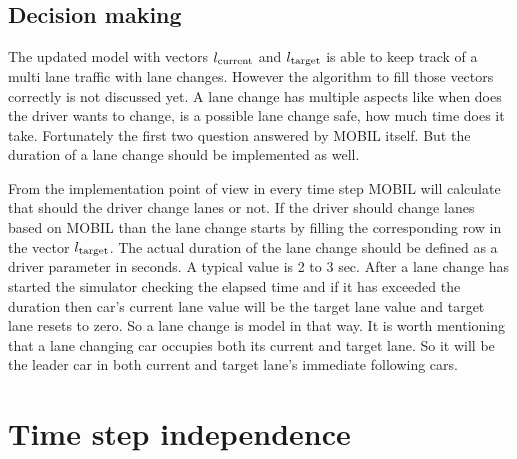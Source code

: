 		\subsection*{Decision making}
		The updated model with vectors $l_{\rm current}$ and $l_{\rm target}$ is able to keep track of a multi lane traffic with lane changes. However the algorithm to fill those vectors correctly is not discussed yet. A lane change has multiple aspects like when does the driver wants to change, is a possible lane change safe, how much time does it take. Fortunately the first two question answered by MOBIL itself. But the duration of a lane change should be implemented as well.

		From the implementation point of view in every time step MOBIL will calculate that should the driver change lanes or not. If the driver should change lanes based on MOBIL than the lane change starts by filling the corresponding row in the vector $l_{\rm target}$. The actual duration of the lane change should be defined as a driver parameter in seconds. A typical value is 2 to 3 sec. After a lane change has started the simulator checking the elapsed time and if it has exceeded the duration then car's current lane value will be the target lane value and target lane resets to zero. So a lane change is model in that way. It is worth mentioning that a lane changing car occupies both its current and target lane. So it will be the leader car in both current and target lane's immediate following cars.
	\section{Time step independence}